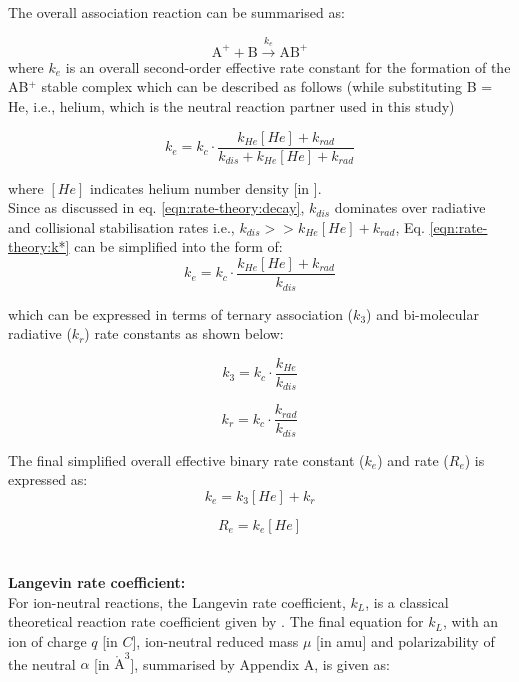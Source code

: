 The overall association reaction can be summarised as:

\[ \text{A}^+ + \text{B} \xrightarrow{k_{e}} \text{AB}^+ \]
where $k_{e}$ is an overall second-order effective rate constant for the formation of the AB$^+$ stable complex which can be described as follows (while substituting B = He, i.e., helium, which is the neutral reaction partner used in this study)

\begin{equation}
    k_{e} = k_c \cdot \frac{k_{He}[He] + k_{rad}}{k_{dis} + k_{He}[He] + k_{rad}} 
    \label{eqn:rate-theory:k*}
\end{equation}

where $[He]$ indicates helium number density [in \percc].\\

Since as discussed in eq. \ref{eqn:rate-theory:decay}, $k_{dis}$ dominates over radiative and collisional stabilisation rates i.e., $k_{dis} >> k_{He}[He] + k_{rad}$, Eq. \ref{eqn:rate-theory:k*} can be simplified into the form of:
\[ k_{e} = k_c \cdot \frac{k_{He}[He] + k_{rad}}{k_{dis}} \]

which can be expressed in terms of ternary association ($k_3$) and bi-molecular radiative ($k_r$) rate constants
as shown below:

\begin{equation}
    k_3 = k_c \cdot \frac{k_{He}}{k_{dis}}
    \label{eqn:rate-theory:k3}
\end{equation}

\begin{equation}
    k_r = k_c \cdot \frac{k_{rad}}{k_{dis}}
    \label{eqn:rate-theory:kr}
\end{equation}

The final simplified overall effective binary rate constant ($k_{e}$) and rate ($R_{e}$) is expressed as:
\begin{equation}
    k_{e} = k_3[He] + k_r
    \label{eqn:rate-theory:k*-simplified}
\end{equation}

\begin{equation}
    R_{e} = k_{e}[He]
    \label{eqn:rate-theory:R*-simplified}
\end{equation}
\\\\
\textbf{Langevin rate coefficient:}\\
For ion-neutral reactions, the Langevin rate coefficient, $k_L$, is a classical theoretical reaction rate coefficient given by \citet{langevin_notitle_1905}.  The final equation for $k_L$, with an ion of charge $q$ [in $C$], ion-neutral reduced mass $\mu$ [in amu] and polarizability of the neutral $\alpha$ [in $\mathring{\text{A}}^3$], summarised by \citet{asvany_numerical_2009} Appendix A, is given as:
\label{discussions:Langevin}

